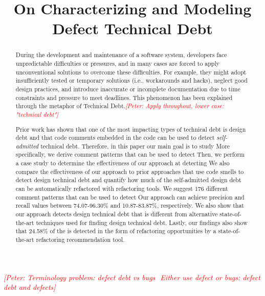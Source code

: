 \documentclass[conference]{IEEEtran}
\newcommand{\peter}[1]{\textcolor{red}{{\it [Peter: #1]}}}
\begin{document}
\title{On Characterizing and Modeling Defect Technical Debt}

\author{

}

\maketitle

\peter{Terminology problem: defect debt vs bugs  Either use defect or bugs: defect debt and defects}
\begin{abstract}
During the development and maintenance of a software system, developers face unpredictable difficulties or pressures, and in many cases are forced to apply unconventional solutions to overcome these difficulties. For example, they might adopt insufficiently tested or temporary solutions (i.e., workarounds and hacks), neglect good design practices, and introduce inaccurate or incomplete documentation
due to time constraints and pressure to meet deadlines. This phenomenon has been explained through the metaphor of Technical Debt.\peter{Apply throughout, lower case: "technical debt"}

Prior work has shown that one of the most impacting types of technical debt is design debt and that code comments embedded in the code can be used to detect \emph{self-admitted} technical debt. Therefore, in this paper our main goal is to study 
More specifically, we derive comment patterns that can be used to detect  Then, we perform a case study to determine the effectiveness of our approach at detecting  We also compare the effectiveness of our approach to prior approaches that use code smells to detect design technical debt and quantify how much of the self-admitted design debt can be automatically refactored with refactoring tools. We suggest 176 different comment patterns that can be used to detect  Our approach can achieve precision and recall values between 74.07-96.30\% and 10.87-83.87\%, respectively. We also show that our approach detects design technical debt that is different from alternative state-of-the-art techniques used for finding design technical debt. Lastly, our findings also show that 24.58\% of the is detected in the form of refactoring opportunities by a state-of-the-art refactoring recommendation tool. 
\end{abstract}
\end{document}
